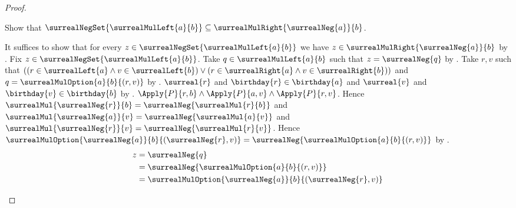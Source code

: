 \begin{proof}
\begin{subproof}
        Show that $\surrealNegSet{\surrealMulLeft{a}{b}}
            \subseteq\surrealMulRight{\surrealNeg{a}}{b}$.
        \begin{subproof}
            It suffices to show that for every
                $z\in\surrealNegSet{\surrealMulLeft{a}{b}}$ we have
                $z\in\surrealMulRight{\surrealNeg{a}}{b}$
                by .
            Fix $z\in\surrealNegSet{\surrealMulLeft{a}{b}}$.
            Take $q\in\surrealMulLeft{a}{b}$ such that
                $z=\surrealNeg{q}$
                by .
            Take $r,v$ such that
                $((r\in\surrealLeft{a}\land v\in\surrealLeft{b})
                  \lor(r\in\surrealRight{a}\land v\in\surrealRight{b}))$
                and $q=\surrealMulOption{a}{b}{(r,v)}$
                by .
            $\surreal{r}$ and $\birthday{r}\in\birthday{a}$ and
                $\surreal{v}$ and $\birthday{v}\in\birthday{b}$
                by .
            $\Apply{P}{r,b}\land
                \Apply{P}{a,v}\land
                \Apply{P}{r,v}$.
            Hence
                $\surrealMul{\surrealNeg{r}}{b}
                    =\surrealNeg{\surrealMul{r}{b}}$ and
                $\surrealMul{\surrealNeg{a}}{v}
                    =\surrealNeg{\surrealMul{a}{v}}$ and
                $\surrealMul{\surrealNeg{r}}{v}
                    =\surrealNeg{\surrealMul{r}{v}}$.
            Hence
                $\surrealMulOption{\surrealNeg{a}}{b}
                    {(\surrealNeg{r},v)}
                =\surrealNeg{\surrealMulOption{a}{b}{(r,v)}}$
                by .
            \begin{align*}
                z
                    &= \surrealNeg{q}
                    \\
                    &= \surrealNeg{\surrealMulOption{a}{b}{(r,v)}}
                    \\
                    &= \surrealMulOption{\surrealNeg{a}}{b}
                        {(\surrealNeg{r},v)}
            \end{align*}
\end{subproof}
\end{subproof}
\end{proof}
